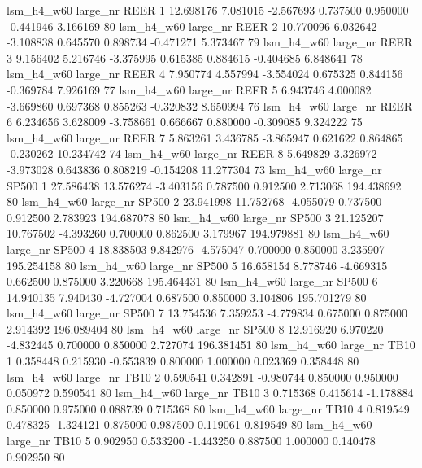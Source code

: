   lsm_h4_w60   large_nr     REER                 1 12.698176  7.081015  -2.567693 0.737500 0.950000 -0.441946    3.166169 80
  lsm_h4_w60   large_nr     REER                 2 10.770096  6.032642  -3.108838 0.645570 0.898734 -0.471271    5.373467 79
  lsm_h4_w60   large_nr     REER                 3  9.156402  5.216746  -3.375995 0.615385 0.884615 -0.404685    6.848641 78
  lsm_h4_w60   large_nr     REER                 4  7.950774  4.557994  -3.554024 0.675325 0.844156 -0.369784    7.926169 77
  lsm_h4_w60   large_nr     REER                 5  6.943746  4.000082  -3.669860 0.697368 0.855263 -0.320832    8.650994 76
  lsm_h4_w60   large_nr     REER                 6  6.234656  3.628009  -3.758661 0.666667 0.880000 -0.309085    9.324222 75
  lsm_h4_w60   large_nr     REER                 7  5.863261  3.436785  -3.865947 0.621622 0.864865 -0.230262   10.234742 74
  lsm_h4_w60   large_nr     REER                 8  5.649829  3.326972  -3.973028 0.643836 0.808219 -0.154208   11.277304 73
  lsm_h4_w60   large_nr    SP500                 1 27.586438 13.576274  -3.403156 0.787500 0.912500  2.713068  194.438692 80
  lsm_h4_w60   large_nr    SP500                 2 23.941998 11.752768  -4.055079 0.737500 0.912500  2.783923  194.687078 80
  lsm_h4_w60   large_nr    SP500                 3 21.125207 10.767502  -4.393260 0.700000 0.862500  3.179967  194.979881 80
  lsm_h4_w60   large_nr    SP500                 4 18.838503  9.842976  -4.575047 0.700000 0.850000  3.235907  195.254158 80
  lsm_h4_w60   large_nr    SP500                 5 16.658154  8.778746  -4.669315 0.662500 0.875000  3.220668  195.464431 80
  lsm_h4_w60   large_nr    SP500                 6 14.940135  7.940430  -4.727004 0.687500 0.850000  3.104806  195.701279 80
  lsm_h4_w60   large_nr    SP500                 7 13.754536  7.359253  -4.779834 0.675000 0.875000  2.914392  196.089404 80
  lsm_h4_w60   large_nr    SP500                 8 12.916920  6.970220  -4.832445 0.700000 0.850000  2.727074  196.381451 80
  lsm_h4_w60   large_nr     TB10                 1  0.358448  0.215930  -0.553839 0.800000 1.000000  0.023369    0.358448 80
  lsm_h4_w60   large_nr     TB10                 2  0.590541  0.342891  -0.980744 0.850000 0.950000  0.050972    0.590541 80
  lsm_h4_w60   large_nr     TB10                 3  0.715368  0.415614  -1.178884 0.850000 0.975000  0.088739    0.715368 80
  lsm_h4_w60   large_nr     TB10                 4  0.819549  0.478325  -1.324121 0.875000 0.987500  0.119061    0.819549 80
  lsm_h4_w60   large_nr     TB10                 5  0.902950  0.533200  -1.443250 0.887500 1.000000  0.140478    0.902950 80
